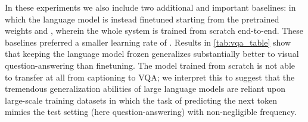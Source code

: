In these experiments we also include two additional and important baselines:  in which the language model is instead finetuned starting from the pretrained weights and , wherein the whole system is trained from scratch end-to-end. These baselines preferred a smaller learning rate of . Results in \autoref{tab:vqa_table} show that keeping the language model frozen generalizes substantially better to visual question-answering than finetuning. The model trained from scratch is not able to transfer at all from captioning to VQA; we interpret this to suggest that the tremendous generalization abilities of large language models are reliant upon large-scale training datasets in which the task of predicting the next token mimics the test setting (here question-answering) with non-negligible frequency.

\begin{table}
\begin{floatrow}
\hspace*{-0.25cm}
\end{floatrow}
\end{table}
